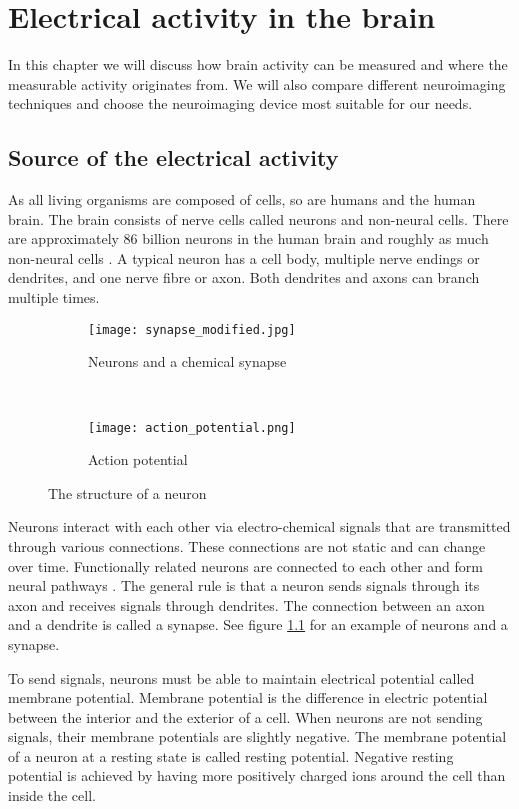 
\chapter{Electrical activity in the brain}

In this chapter we will discuss how brain activity can be measured and where the measurable activity originates from. We will also compare different neuroimaging techniques and choose the neuroimaging device most suitable for our needs. 

\section{Source of the electrical activity}
\label{sec:neuron}

As all living organisms are composed of cells, so are humans and the human brain. The brain consists of nerve cells called neurons and non-neural cells. There are approximately 86 billion neurons in the human brain and roughly as much non-neural cells \cite{neuroncount}. A typical neuron has a cell body, multiple nerve endings or dendrites, and one nerve fibre or axon. Both dendrites and axons can branch multiple times. 

\begin{figure}[b!]
	\centering
	\begin{subfigure}{0.48\textwidth}
		\texttt{[image: synapse\_modified.jpg]}
		\caption{Neurons and a chemical synapse \cite[p.~17]{neuronpic}}
		\label{fig:neuron_synapse}
	\end{subfigure}
	~
	\begin{subfigure}{0.48\textwidth}
		\texttt{[image: action\_potential.png]}
		\caption{Action potential \cite{action_potential_pic}}
		\label{fig:action_potential}
	\end{subfigure}
	\caption{The structure of a neuron}
\end{figure}

Neurons interact with each other via electro-chemical signals that are transmitted through various connections. These connections are not static and can change over time. Functionally related neurons are connected to each other and form neural pathways \cite{neuralpathway}. The general rule is that a neuron sends signals through its axon and receives signals through dendrites. The connection between an axon and a dendrite is called a synapse. See figure \ref{fig:neuron_synapse} for an example of neurons and a synapse.

To send signals, neurons must be able to maintain electrical potential called membrane potential. Membrane potential is the difference in electric potential between the interior and the exterior of a cell. When neurons are not sending signals, their membrane potentials are slightly negative. The membrane potential of a neuron at a resting state is called resting potential. Negative resting potential is achieved by having more positively charged ions around the cell than inside the cell.

